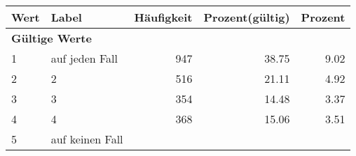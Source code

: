      \begin{longtable}{lXrrr}
     \toprule
     \textbf{Wert} & \textbf{Label} & \textbf{Häufigkeit} & \textbf{Prozent(gültig)} & \textbf{Prozent} \\
     \endhead
     \midrule
     \multicolumn{5}{l}{\textbf{Gültige Werte}}\\

     1 &
     \multicolumn{1}{X}{ auf jeden Fall   } &


       \num{947} &
       \num[round-mode=places,round-precision=2]{38,75} &
         \num[round-mode=places,round-precision=2]{9,02} \\

     2 &
     \multicolumn{1}{X}{ 2   } &


       \num{516} &
       \num[round-mode=places,round-precision=2]{21,11} &
         \num[round-mode=places,round-precision=2]{4,92} \\

     3 &
     \multicolumn{1}{X}{ 3   } &


       \num{354} &
       \num[round-mode=places,round-precision=2]{14,48} &
         \num[round-mode=places,round-precision=2]{3,37} \\

     4 &
     \multicolumn{1}{X}{ 4   } &


       \num{368} &
       \num[round-mode=places,round-precision=2]{15,06} &
         \num[round-mode=places,round-precision=2]{3,51} \\

     5 &
     \multicolumn{1}{X}{ auf keinen Fall   } &



\end{longtable}
